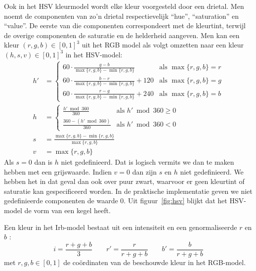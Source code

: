 Ook in het HSV kleurmodel \cite{tkalcic:colour_spaces} wordt elke kleur voorgesteld 
door een drietal. Men noemt de componenten van zo'n drietal respectievelijk 
``hue'', ``saturation'' en ``value''. De eerste van die componenten 
correspondeert met de kleurtint, terwijl de overige componenten de saturatie
en de helderheid aangeven. Men kan een kleur $(r,g,b) \in [0,1]^3$ uit het RGB 
model als volgt omzetten naar een kleur $(h,s,v) \in [0,1]^3$ in het HSV-model: 
\begin{align*}
h' & = \begin{cases}
60 \cdot \frac{g - b}{\max \{r,g,b\} - \min \{r,g,b\}} & \textrm{als } \max \{r,g,b\} = r \\[2pt]
60 \cdot \frac{b - r}{\max \{r,g,b\} - \min \{r,g,b\}} + 120 & \textrm{als } \max \{r,g,b\} = g \\[2pt]
60 \cdot \frac{r - g}{\max \{r,g,b\} - \min \{r,g,b\}} + 240 & \textrm{als } \max \{r,g,b\} = b
\end{cases} \\[2pt]
h & = \begin{cases}
\frac{h' \bmod 360}{360} & \textrm{als } h' \bmod 360 \geq 0 \\[2pt] 
\frac{360 - (h' \bmod 360)}{360} & \textrm{als } h' \bmod 360 < 0 
\end{cases} \\[2pt]
s & = \frac{\max \{r,g,b\} - \min \{r,g,b\}}{\max \{r,g,b\}} \\ %
v & = \max \{r,g,b\}
\end{align*}
Als $s=0$ dan is $h$ niet gedefinieerd. Dat is logisch vermits we dan te 
maken hebben met een grijswaarde. Indien $v=0$ dan zijn $s$ en $h$ niet gedefinieerd. We 
hebben het in dat geval dan ook over puur zwart, waarvoor er geen kleurtint of 
saturatie kan gespecificeerd worden. In de praktische implementatie geven we 
niet gedefinieerde componenten de waarde $0$. Uit figuur~\ref{fig:hsv} blijkt dat
het HSV-model de vorm van een kegel heeft.

Een kleur in het Irb-model bestaat uit een intensiteit en een genormaliseerde $r$ en $b$ 
\cite{ohta:color_info_for_region_segm}:
\begin{displaymath}
 i = \frac{r+g+b}{3} \qquad r' = 
\frac{r}{r+g+b} \qquad b' = \frac{b}{r+g+b}
\end{displaymath}
met $r,g,b \in [0,1]$ de co\"ordinaten van de beschouwde kleur in het RGB-model. 

